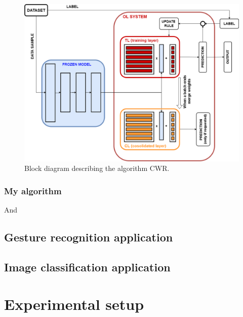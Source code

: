 \documentclass[12pt]{report}
\begin{document}
\begin{figure}[h!]
    \centering
    \includegraphics[width=120mm]{Figures/Chapter3/CWR_.png} 
    \caption{Block diagram describing the algorithm CWR.}
    \label{fig:block_diag_CWR}    
\end{figure}

\subsection{My algorithm}





And


\section{Gesture recognition application}

\section{Image classification application}





\chapter{Experimental setup}
\end{document}
